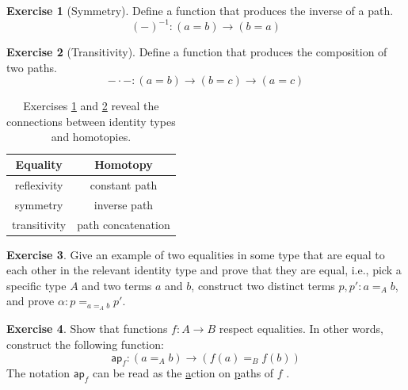 \documentclass{amsart}
\theoremstyle{definition}
\newtheorem{ex}{Exercise}[section]
\begin{document}

\begin{ex}[Symmetry]\label{ex:id-symmetry}
    Define a function that produces the inverse of a path.
    \[
        (-)^{-1} : (a = b) \to (b = a)
    \]
\end{ex}

\begin{ex}[Transitivity]\label{ex:id-transitivity}
    Define a function that produces the composition of two paths.
    \[
        - \cdot - : (a = b) \to (b = c) \to (a = c)
    \]
\end{ex}

\begin{table}[h]
    \centering
    \begin{tabular}{|c|c|}\hline
        Equality & Homotopy \\\hline
        reflexivity & constant path \\\hline
        symmetry & inverse path \\\hline
        transitivity & path concatenation \\\hline
    \end{tabular}
    \caption{Exercises \ref{ex:id-symmetry} and \ref{ex:id-transitivity} reveal the connections between identity types and homotopies.}
    \label{tab:equalities-and-homotopy}
\end{table}

\begin{ex}
    Give an example of two equalities in some type that are equal to each other in the relevant identity type and prove that they are equal, i.e., pick a specific type $A$ and two terms $a$ and $b$, construct two distinct terms $p, p' : a =_A b$, and prove $\alpha : p \mathbf{=}_{a =_A b} p'$.
\end{ex}

\begin{ex}
    Show that functions $f : A \to B$ respect equalities.
    In other words, construct the following function:
    \[
        \mathsf{ap}_{f} : (a =_{A} b) \to (f(a) =_{B} f(b))
    \]
    The notation $\mathsf{ap}_{f}$ can be read as the \underline{a}ction on \underline{p}aths of $f$ \cite{hottbook}.
\end{ex}

%    
\end{document}
